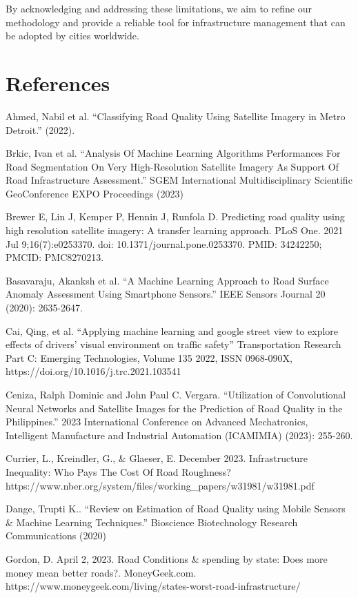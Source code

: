 \documentclass{article}
\begin{document}
By acknowledging and addressing these limitations, we aim to refine our methodology and provide a reliable tool for infrastructure management that can be adopted by cities worldwide.



\section*{References}



{
\small
Ahmed, Nabil et al. “Classifying Road Quality Using Satellite Imagery in Metro Detroit.” (2022).

Brkic, Ivan et al. “Analysis Of Machine Learning Algorithms Performances For Road Segmentation On Very High-Resolution Satellite Imagery As Support Of Road Infrastructure Assessment.” SGEM International Multidisciplinary Scientific GeoConference EXPO Proceedings (2023)

Brewer E, Lin J, Kemper P, Hennin J, Runfola D. Predicting road quality using high resolution satellite imagery: A transfer learning approach. PLoS One. 2021 Jul 9;16(7):e0253370. doi: 10.1371/journal.pone.0253370. PMID: 34242250; PMCID: PMC8270213.

Basavaraju, Akanksh et al. “A Machine Learning Approach to Road Surface Anomaly Assessment Using Smartphone Sensors.” IEEE Sensors Journal 20 (2020): 2635-2647.

Cai, Qing, et al. “Applying machine learning and google street view to explore effects of drivers’ visual environment on traffic safety” Transportation Research Part C: Emerging Technologies, Volume 135 2022, ISSN 0968-090X, https://doi.org/10.1016/j.trc.2021.103541

Ceniza, Ralph Dominic and John Paul C. Vergara. “Utilization of Convolutional Neural Networks and Satellite Images for the Prediction of Road Quality in the Philippines.” 2023 International Conference on Advanced Mechatronics, Intelligent Manufacture and Industrial Automation (ICAMIMIA) (2023): 255-260.

Currier, L., Kreindler, G., \& Glaeser, E. December 2023. Infrastructure Inequality: Who Pays The Cost Of Road Roughness? https://www.nber.org/system/files/working\_papers/w31981/w31981.pdf

Dange, Trupti K.. “Review on Estimation of Road Quality using Mobile Sensors \& Machine Learning Techniques.” Bioscience Biotechnology Research Communications (2020)

Gordon, D. April 2, 2023. Road Conditions \& spending by state: Does more money mean better roads?. MoneyGeek.com. https://www.moneygeek.com/living/states-worst-road-infrastructure/

}
\end{document}
